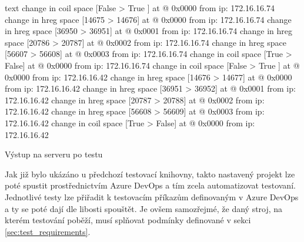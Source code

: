 \begin{listing}[htbp]
\begin{cminted}[breaklines,autogobble, fontsize=\footnotesize]{text}
change in coil space [False > True ] at @ 0x0000 from ip: 172.16.16.74   
change in hreg space [14675 > 14676] at @ 0x0000 from ip: 172.16.16.74   
change in hreg space [36950 > 36951] at @ 0x0001 from ip: 172.16.16.74   
change in hreg space [20786 > 20787] at @ 0x0002 from ip: 172.16.16.74   
change in hreg space [56607 > 56608] at @ 0x0003 from ip: 172.16.16.74   
change in coil space [True  > False] at @ 0x0000 from ip: 172.16.16.74   
change in coil space [False > True ] at @ 0x0000 from ip: 172.16.16.42   
change in hreg space [14676 > 14677] at @ 0x0000 from ip: 172.16.16.42   
change in hreg space [36951 > 36952] at @ 0x0001 from ip: 172.16.16.42   
change in hreg space [20787 > 20788] at @ 0x0002 from ip: 172.16.16.42   
change in hreg space [56608 > 56609] at @ 0x0003 from ip: 172.16.16.42   
change in coil space [True  > False] at @ 0x0000 from ip: 172.16.16.42   
    \end{cminted}
\caption{Výstup na serveru po testu}
\label{listing:modbus_server_log}
\end{listing}

Jak již bylo ukázáno u předchozí testovací knihovny\cite{bakalarka}, takto nastavený projekt lze poté spustit prostřednictvím Azure DevOps a tím zcela automatizovat testovaní. Jednotlivé testy lze přiřadit k testovacím příkazům definovaným v Azure DevOps a ty se poté dají dle libosti spouštět. Je ovšem samozřejmé, že daný stroj, na kterém testování poběží, musí splňovat podmínky definované v sekci \ref{sec:test_requirements}.


